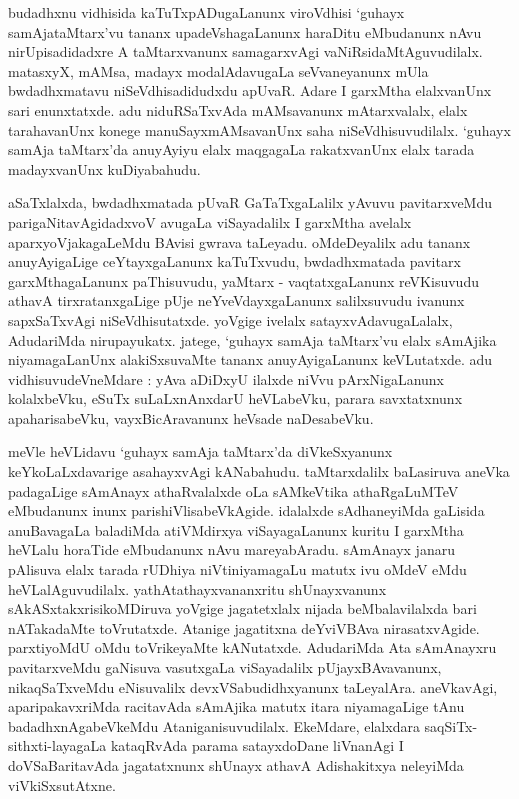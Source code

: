 budadhxnu vidhisida kaTuTxpADugaLanunx viroVdhisi `guhayx samAjataMtarx'vu tananx upadeVshagaLanunx haraDitu eMbudanunx nAvu nirUpisadidadxre A taMtarxvanunx samagarxvAgi vaNiRsidaMtAguvudilalx. matasxyX, mAMsa, madayx modalAdavugaLa seVvaneyanunx mUla bwdadhxmatavu niSeVdhisadidudxdu apUvaR. Adare I garxMtha elalxvanUnx sari enunxtatxde. adu niduRSaTxvAda mAMsavanunx mAtarxvalalx, elalx tarahavanUnx konege manuSayxmAMsavanUnx saha niSeVdhisuvudilalx. `guhayx samAja taMtarx'da anuyAyiyu elalx maqgagaLa rakatxvanUnx elalx tarada madayxvanUnx kuDiyabahudu.

aSaTxlalxda, bwdadhxmatada pUvaR GaTaTxgaLalilx yAvuvu pavitarxveMdu parigaNita\-vAgidadxvoV avugaLa viSayadalilx I garxMtha avelalx aparxyoVjakagaLeMdu BAvisi gwrava taLeyadu. oMdeDeyalilx adu tananx anuyAyigaLige ceYtayxgaLanunx kaTuTxvudu, bwdadhxmatada pavitarx garxMthagaLanunx paThisuvudu, yaMtarx - vaqtatxgaLanunx reVKisuvudu athavA tirxratanxgaLige pUje neYveVdayxgaLanunx salilxsuvudu ivanunx sapxSaTxvAgi niSeVdhisutatxde. yoVgige ivelalx satayxvAdavugaLalalx, AdudariMda nirupayukatx. jatege, `guhayx samAja taMtarx'vu elalx sAmAjika niyamagaLanUnx alakiSxsuvaMte tananx anuyAyigaLanunx keVLutatxde. adu vidhisuvudeVneMdare : yAva aDiDxyU ilalxde niVvu pArxNigaLanunx kolalxbeVku, eSuTx suLaLxnAnxdarU heVLabeVku, parara savxtatxnunx apaharisabeVku, vayxBicAravanunx heVsade naDesabeVku.

meVle heVLidavu `guhayx samAja taMtarx'da diVkeSxyanunx keYkoLaLxdavarige asahayxvAgi kANabahudu. taMtarxdalilx baLasiruva aneVka padagaLige sAmAnayx athaRvalalxde oLa sAMkeVtika athaRgaLuMTeV eMbudanunx inunx parishiVlisabeVkAgide. idalalxde sAdhaneyiMda gaLisida anuBavagaLa baladiMda atiVMdirxya viSayagaLanunx kuritu I garxMtha heVLalu horaTide eMbudanunx nAvu mareyabAradu. sAmAnayx janaru pAlisuva elalx tarada rUDhiya niVtiniyamagaLu matutx ivu oMdeV eMdu heVLalAguvudilalx. yathAtathayxvananxritu shUnayxvanunx sAkASxtakxrisikoMDiruva yoVgige jagatetxlalx nijada beMbalavilalxda bari nATakadaMte toVrutatxde. Atanige jagatitxna deYviVBAva nirasatxvAgide. parxtiyoMdU oMdu toVrikeyaMte kANutatxde. AdudariMda Ata sAmAnayxru pavitarxveMdu gaNisuva vasutxgaLa viSayadalilx pUjayxBAvavanunx, nikaqSaTxveMdu eNisuvalilx devxVSabudidhxyanunx taLeyalAra. aneVkavAgi, aparipakavxriMda racitavAda sAmAjika matutx itara niyamagaLige tAnu badadhxnAgabeVkeMdu Ataniganisuvudilalx. EkeMdare, elalxdara saqSiTx-sithxti-layagaLa kataqRvAda parama satayxdoDane liVnanAgi I doVSaBaritavAda jagatatxnunx shUnayx athavA Adishakitxya neleyiMda viVkiSxsutAtxne.

